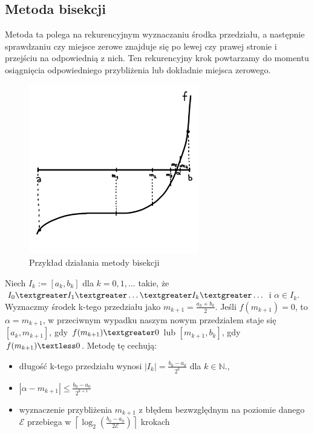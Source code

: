 \documentclass[a4paper,11pt]{article}
\newcommand{\ceil}[1]{\left\lceil #1 \right\rceil}
\begin{document}
\subsection{Metoda bisekcji}
Metoda ta polega na rekurencyjnym wyznaczaniu środka przedziału, a następnie sprawdzaniu czy miejsce zerowe znajduje się po lewej czy prawej stronie i przejściu na odpowiednią z nich. Ten rekurencyjny krok powtarzamy do momentu osiągnięcia odpowiedniego przybliżenia lub dokładnie miejsca zerowego.

\begin{figure}[H]
\centering
\includegraphics[width=0.66\textwidth]{metodabisekcji.png}
\caption{Przykład działania metody bisekcji}
\label{metodabisekcji}
\end{figure}

\noindent Niech $I_k := [a_k, b_k]$ dla $k=0,1,\ldots$ takie, że $I_0 \textgreater I_1 \textgreater \ldots \textgreater I_k \textgreater \ldots$ i $\alpha \in I_k$. Wyznaczmy środek k-tego przedziału jako $m_{k+1}=\frac{a_k+b_k}{2}$. Jeśli $f(m_{k+1})=0$, to $\alpha=m_{k+1}$, w przeciwnym wypadku naszym nowym przedziałem staje się $[a_k, m_{k+1}]$, gdy $f(m_{k+1}) \textgreater 0$ lub $[m_{k+1}, b_k]$, gdy $f(m_{k+1}) \textless 0$. 
\newline Metodę tę cechują:
\begin{itemize}
\item długość k-tego przedziału wynosi $|I_k|=\frac{b_0-a_0}{2^k}$ dla $k\in\mathbb{N}$.,
\item $|\alpha-m_{k+1}| \leq \frac{b_0-a_0}{2^{k+1}}$
\item wyznaczenie przybliżenia $m_{k+1}$ z błędem bezwzględnym na poziomie danego $\mathcal{E}$ przebiega w $\ceil{\log_{2}\left( \frac{b_0-a_0}{2\mathcal{E}} \right) }$ krokach
\end{itemize}
\end{document}
